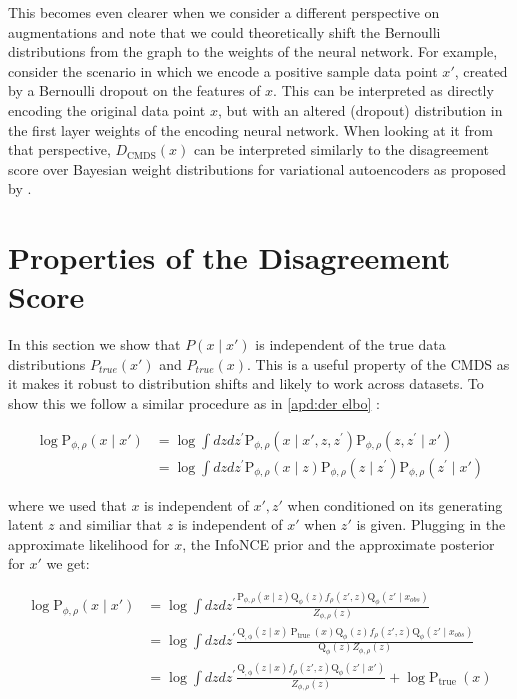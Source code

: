 \documentclass[tablecaption=bottom,wcp]{jmlr} %
\begin{document}
This becomes even clearer when we consider a different perspective on augmentations and note that we could theoretically shift the Bernoulli distributions from the graph to the weights of the neural network. For example,  consider the scenario in which we encode a positive sample data point $x'$, created by a Bernoulli dropout on the features of $x$. This  can be interpreted as directly encoding the original data point $x$, but with an altered (dropout) distribution in the first layer weights of the encoding neural network. When looking at it from that perspective, $D_{\text{CMDS}}(x)$ can be interpreted similarly to   the disagreement score over Bayesian weight distributions for variational autoencoders as proposed by \citet{BVAE}.






\section{Properties of the Disagreement Score}\label{apd:Uncertainty Measure}

In this section we show that $P(x \mid x')$ is independent of the true data distributions $P_{true}(x')$ and $P_{true}(x)$. This is a useful property of the CMDS as it makes it robust to distribution shifts and likely to work across datasets. To show this we follow a similar procedure as in \cref{apd:der elbo} : 

\begin{align}
\log \mathrm{P}_{\phi,\rho}\left(x\mid x' \right) &=\log \int d z  d z^{\prime} \mathrm{P}_{\phi,\rho}\left(x \mid x',  z,z^{\prime} \right)  \mathrm{P}_{\phi,\rho}\left(z,z^{\prime} \mid x'  \right)  \\ &= 
\log \int d z  d z^{\prime} \mathrm{P}_{\phi,\rho}\left(x \mid z \right)   \mathrm{P}_{\phi,\rho}\left(z \mid z^{\prime} \right) \mathrm{P}_{\phi,\rho}\left(z^{\prime} \mid x'  \right)
\end{align}

where we used that $x$ is independent of $x', z'$ when conditioned on its generating latent $z$ and similiar that $z$ is independent of $x'$ when $z'$ is given. Plugging in the approximate likelihood for $x$, the InfoNCE prior and the approximate posterior for $x'$ we get: 

\begin{align}
\log \mathrm{P}_{\phi,\rho}\left(x\mid x' \right) &= \log \int d z  d z^{\prime} \frac{\mathrm{P}_{\phi,\rho}\left(x \mid z \right)   \mathrm{Q}_\phi\left(z\right) f_\rho\left(z', z \right)\mathrm{Q}_{\phi}\left(z' \mid x_{obs}  \right)}{Z_{\phi, \rho}(z)} \\ 
 &= \log \int d z  d z^{\prime} \frac{\mathrm{Q_{,\phi}}(z \mid x) \ \mathrm{P}_{\text {true }}\left(x\right)\mathrm{Q}_\phi\left(z\right) f_\rho\left(z', z \right)\mathrm{Q}_{\phi}\left(z' \mid x_{obs}  \right)}{\mathrm{Q}_{\phi}\left(z \right)Z_{\phi, \rho}(z)} \\
  &= \log \int d z  d z^{\prime} \frac{\mathrm{Q_{,\phi}}(z \mid x)  f_\rho\left(z', z \right)\mathrm{Q}_{\phi}\left(z' \mid x'  \right)}{Z_{\phi, \rho}(z)} + \log \mathrm{P}_{\text {true }}\left(x\right)
\end{align}
\end{document}
